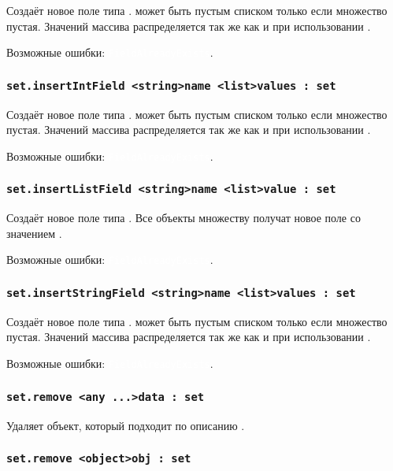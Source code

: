 \documentclass[a4paper, 14pt]{extarticle}
\newcommand{\ferror}[1]{{\fontsize{11pt}{12pt} \tt \colorbox{function}{\textcolor{white}{#1}}}}
\begin{document}
Создаёт новое поле типа \double.  может быть пустым списком только если множество пустая. Значений массива распределяется так же как и при использовании .

Возможные ошибки: \ferror{FieldAlreadyExists}.

\subsubsection{\lstinline|set.insertIntField <string>name <list>values : set|}

Создаёт новое поле типа \integer.  может быть пустым списком только если множество пустая. Значений массива распределяется так же как и при использовании .

Возможные ошибки: \ferror{FieldAlreadyExists}.

\subsubsection{\lstinline|set.insertListField <string>name <list>value : set|}

Создаёт новое поле типа \bool. Все объекты множеству получат новое поле со значением .

Возможные ошибки: \ferror{FieldAlreadyExists}.

\subsubsection{\lstinline|set.insertStringField <string>name <list>values : set|}

Создаёт новое поле типа \str.  может быть пустым списком только если множество пустая. Значений массива распределяется так же как и при использовании .

Возможные ошибки: \ferror{FieldAlreadyExists}.

\subsubsection{\lstinline|set.remove <any ...>data : set|}

Удаляет объект, который подходит по описанию .

\subsubsection{\lstinline|set.remove <object>obj : set|}
\end{document}
